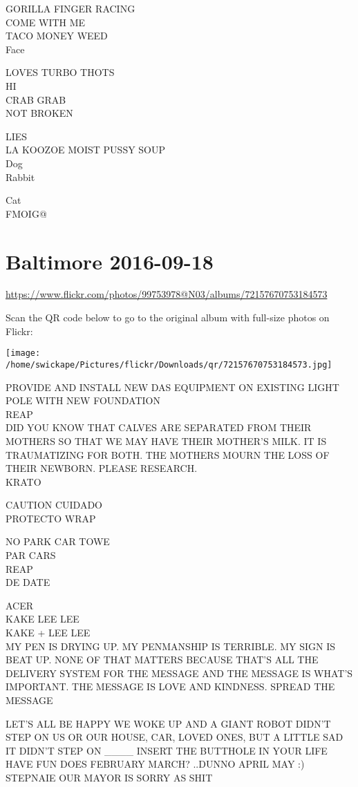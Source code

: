 \documentclass[10pt,letterpaper]{article}
\begin{document}
GORILLA FINGER RACING\\
COME WITH ME\\
TACO MONEY WEED\\
Face

LOVES TURBO THOTS\\
HI\\
CRAB GRAB\\
NOT BROKEN

LIES\\
LA KOOZOE MOIST PUSSY SOUP\\
Dog\\
Rabbit

Cat\\
FMOIG@
\pagebreak

\section*{Baltimore 2016-09-18}

\url{https://www.flickr.com/photos/99753978@N03/albums/72157670753184573}

Scan the QR code below to go to the original album with full-size photos on Flickr:

\texttt{[image: /home/swickape/Pictures/flickr/Downloads/qr/72157670753184573.jpg]}
\pagebreak

PROVIDE AND INSTALL NEW DAS EQUIPMENT ON EXISTING LIGHT POLE WITH NEW FOUNDATION\\
REAP\\
DID YOU KNOW THAT CALVES ARE SEPARATED FROM THEIR MOTHERS SO THAT WE MAY HAVE THEIR MOTHER'S MILK.  IT IS TRAUMATIZING FOR BOTH.  THE MOTHERS MOURN THE LOSS OF THEIR NEWBORN.  PLEASE RESEARCH.\\
KRATO

CAUTION CUIDADO\\
PROTECTO WRAP

NO PARK CAR TOWE\\
PAR CARS\\
REAP\\
DE DATE

ACER\\
KAKE LEE LEE\\
KAKE + LEE LEE\\
MY PEN IS DRYING UP.  MY PENMANSHIP IS TERRIBLE.  MY SIGN IS BEAT UP.  NONE OF THAT MATTERS BECAUSE THAT'S ALL THE DELIVERY SYSTEM FOR THE MESSAGE AND THE MESSAGE IS WHAT'S IMPORTANT.  THE MESSAGE IS LOVE AND KINDNESS.  SPREAD THE MESSAGE

LET'S ALL BE HAPPY WE WOKE UP AND A GIANT ROBOT DIDN'T STEP ON US OR OUR HOUSE, CAR, LOVED ONES, BUT A LITTLE SAD IT DIDN'T STEP ON \_\_\_\_ INSERT THE BUTTHOLE IN YOUR LIFE\\
HAVE FUN DOES FEBRUARY MARCH?  ..DUNNO APRIL MAY :)\\
STEPNAIE OUR MAYOR IS SORRY AS SHIT
\end{document}
